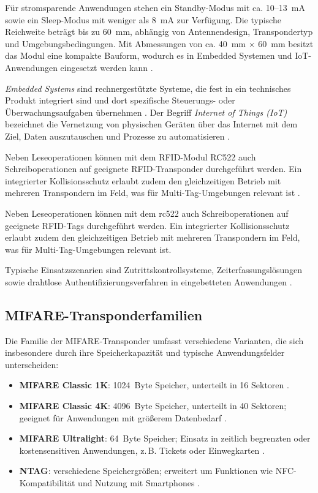 Für stromsparende Anwendungen stehen ein Standby-Modus mit ca. 10–13~mA sowie ein Sleep-Modus mit weniger als 8~mA zur Verfügung. 
Die typische Reichweite beträgt bis zu 60~mm, abhängig von Antennendesign, Transpondertyp und Umgebungsbedingungen. 
Mit Abmessungen von ca. 40~mm $\times$ 60~mm besitzt das Modul eine kompakte Bauform, wodurch es in Embedded Systemen und IoT-Anwendungen eingesetzt werden kann \cite{Handsontec:2023}.

\emph{Embedded Systems} sind rechnergestützte Systeme, die fest in ein technisches Produkt integriert sind und dort spezifische Steuerungs- oder Überwachungsaufgaben übernehmen \cite{Marwedel:2021}. 
Der Begriff \emph{Internet of Things (IoT)} bezeichnet die Vernetzung von physischen Geräten über das Internet mit dem Ziel, Daten auszutauschen und Prozesse zu automatisieren \cite{ISO20924:2018,Vermesan:2013}.


Neben Leseoperationen können mit dem RFID-Modul RC522 auch Schreiboperationen auf geeignete RFID-Transponder durchgeführt werden. 
Ein integrierter Kollisionsschutz erlaubt zudem den gleichzeitigen Betrieb mit mehreren Transpondern im Feld, was für Multi-Tag-Umgebungen relevant ist \cite{finkenzeller:2019}.

Neben Leseoperationen können mit dem \ac{rc522} auch Schreiboperationen auf geeignete RFID-Tags durchgeführt werden. 
Ein integrierter Kollisionsschutz erlaubt zudem den gleichzeitigen Betrieb mit mehreren Transpondern im Feld, was für Multi-Tag-Umgebungen relevant ist. 

Typische Einsatzszenarien sind Zutrittskontrollsysteme, Zeiterfassungslösungen sowie drahtlose Authentifizierungsverfahren in eingebetteten Anwendungen \cite{Liu:2024}.





\subsection{MIFARE-Transponderfamilien}\label{subsec:mifare}

Die Familie der MIFARE-Transponder umfasst verschiedene Varianten, die sich insbesondere durch ihre Speicherkapazität und typische Anwendungsfelder unterscheiden:

\begin{itemize}
	\item \textbf{MIFARE Classic 1K}: 1024~Byte Speicher, unterteilt in 16 Sektoren \cite{NXP:2008}.
	\item \textbf{MIFARE Classic 4K}: 4096~Byte Speicher, unterteilt in 40 Sektoren; geeignet für Anwendungen mit größerem Datenbedarf \cite{NXP:2008}.
	\item \textbf{MIFARE Ultralight}: 64~Byte Speicher; Einsatz in zeitlich begrenzten oder kostensensitiven Anwendungen, z.\,B. Tickets oder Einwegkarten \cite{NXP:2011}.
	\item \textbf{NTAG}: verschiedene Speichergrößen; erweitert um Funktionen wie NFC-Kompatibilität und Nutzung mit Smartphones \cite{NXP:2016}.
\end{itemize}

